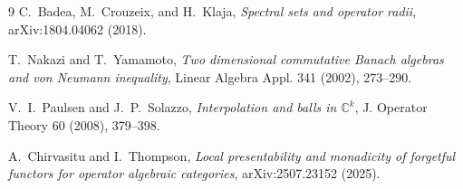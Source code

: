 \documentclass[11pt]{article}
\newcommand{\C}{\mathbb C}
\begin{document}
\begin{thebibliography}{9}
C.~Badea, M.~Crouzeix, and H.~Klaja,
\emph{Spectral sets and operator radii}, arXiv:1804.04062 (2018).

T.~Nakazi and T.~Yamamoto,
\emph{Two dimensional commutative Banach algebras and von Neumann inequality},
Linear Algebra Appl. 341 (2002), 273--290.

V.~I.~Paulsen and J.~P.~Solazzo,
\emph{Interpolation and balls in $\C^k$},
J. Operator Theory 60 (2008), 379--398.

A.~Chirvasitu and I.~Thompson,
\emph{Local presentability and monadicity of forgetful functors for operator
algebraic categories}, arXiv:2507.23152 (2025).
\end{thebibliography}
\end{document}
